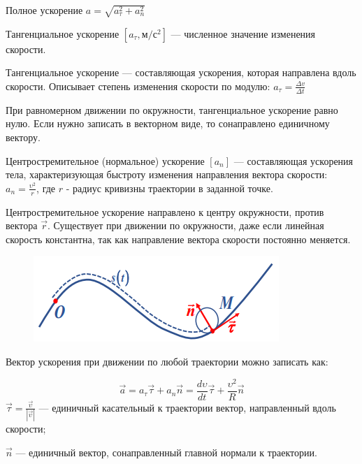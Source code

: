 \begin{definition}
    Полное ускорение $a = \sqrt{a_\tau^2 + a_n^2}$    
\end{definition}

\begin{definition}
    Тангенциальное ускорение $[a_\tau, м/с^2]$ — численное значение изменения скорости.    
\end{definition}
 
\begin{remark}
    Тангенциальное ускорение — составляющая ускорения, которая направлена вдоль скорости. Описывает степень изменения скорости по модулю: $a_\tau = \frac{\Delta v}{\Delta t}$
\end{remark}

При равномерном движении по окружности, тангенциальное ускорение равно нулю. Если нужно записать в векторном виде, то сонаправлено единичному вектору.

\begin{definition}
    Центростремительное (нормальное) ускорение $[a_n]$ — составляющая ускорения тела, характеризующая быстроту изменения направления вектора скорости: $a_n=\frac{\upsilon^2}{r}$, где $r$ - радиус кривизны траектории в заданной точке.
\end{definition}

Центростремительное ускорение направлено к центру окружности, против вектора $\vec r$. 
Существует при движении по окружности, даже если линейная скорость константна, так как направление вектора скорости постоянно меняется.

\begin{figure}[h]
    \centering
    \includegraphics[width=0.5\linewidth]{imgs/q1i2.png}
    \label{q1i2}
\end{figure}

Вектор ускорения при движении по любой траектории можно записать как:

$$\vec a=a_\tau\vec\tau+a_n\vec n=\frac{d\upsilon}{dt}\vec\tau+\frac{\upsilon^2}{R}\vec n$$
$\vec\tau=\frac{\vec\upsilon}{|\vec\upsilon|}$ — единичный касательный к траектории вектор, направленный вдоль скорости;

$\vec n$ — единичный вектор, сонаправленный главной нормали к траектории.

